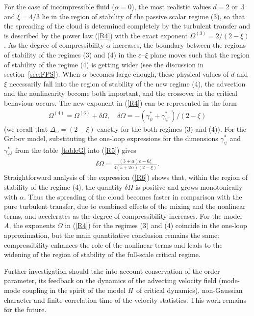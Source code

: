 \documentclass[12pt]{article}
\begin{document}
For the case of incompressible fluid ($\alpha=0$), the most realistic values
$d=2$ or~3 and $\xi=4/3$ lie in the region of stability of the passive scalar
regime (3), so that the spreading of the cloud is determined completely
by the turbulent transfer and is described by the power law (\ref{R4})
with the exact exponent $\Omega^{(3)}= 2/(2-\xi)$. As the degree of
compressibility $\alpha$ increases, the boundary between the regions of
stability of the regimes (3) and (4) in the $\varepsilon$--$\xi$ plane
moves such that the region of
stability of the regime (4) is getting wider (see the discussion in
section~\ref{sec:FPS}). When $\alpha$ becomes large enough, these physical
values of $d$ and $\xi$ necessarily fall into the region of stability of the
new regime (4), the advection and the nonlinearity become both important,
and the crossover in the critical behaviour occurs. The new exponent in
(\ref{R4}) can be represented in the form
\begin{eqnarray}
\Omega^{(4)}= \Omega^{(3)} + \delta\Omega, \quad
\delta\Omega = - (\gamma_{\psi}^{*}+\gamma_{\psi^{\dag}}^{*}) / (2-\xi)
\label{R5}
\end{eqnarray}
(we recall that $\Delta_{\omega}=(2-\xi)$ exactly for the both regimes
(3) and (4)). For the Gribov model, substituting the one-loop expressions
for the dimensions $\gamma_{\psi}^{*}$ and $\gamma_{\psi^{\dag}}^{*}$
from the table~\ref{tableG} into (\ref{R5}) gives
\begin{eqnarray}
\delta\Omega = \frac{(3+\alpha)\varepsilon-6\xi}{3(5+2\alpha)(2-\xi)}.
\label{R6}
\end{eqnarray}
Straightforward analysis of the expression (\ref{R6}) shows that, within
the region of stability of the regime (4), the quantity $\delta\Omega$ is
positive and grows monotonically with $\alpha$. Thus the spreading of
the cloud becomes faster in comparison with the pure turbulent transfer,
due to combined effects of the mixing and the nonlinear terms, and
accelerates as the degree of compressibility increases. For the model
{\it A}, the exponents $\Omega$ in (\ref{R4}) for the regimes (3) and (4)
coincide in the one-loop approximation, but the main quantitative
conclusion remains the same: compressibility enhances the role of the
nonlinear terms and leads to the widening of the region of stability of
the full-scale critical regime.

Further investigation should take into account conservation of the order
parameter, its feedback on the dynamics of the advecting velocity field
(mode-mode coupling in the spirit of the model {\it H}\, of critical
dynamics), non-Gaussian character and finite correlation time of the
velocity statistics. This work remains for the future.
\end{document}
